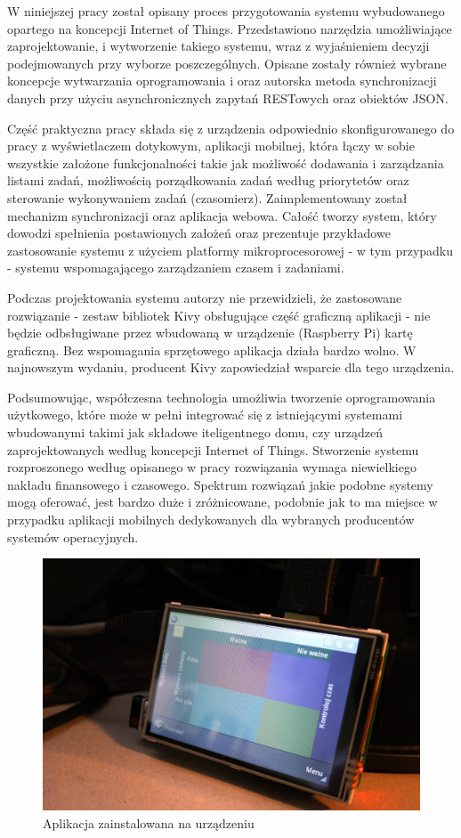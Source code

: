 W niniejszej pracy został opisany proces przygotowania systemu wybudowanego opartego na koncepcji Internet of Things.
Przedstawiono narzędzia umożliwiające zaprojektowanie, i wytworzenie takiego systemu, wraz z wyjaśnieniem decyzji podejmowanych przy wyborze poszczególnych. Opisane zostały również wybrane koncepcje wytwarzania oprogramowania i oraz autorska metoda synchronizacji danych przy użyciu asynchronicznych zapytań RESTowych oraz obiektów JSON.

Część praktyczna pracy składa się z urządzenia odpowiednio skonfigurowanego do pracy z wyświetlaczem dotykowym, aplikacji mobilnej, która  łączy w sobie wszystkie założone funkcjonalności takie jak możliwość dodawania i zarządzania listami zadań, możliwością porządkowania zadań według priorytetów oraz sterowanie wykonywaniem zadań (czasomierz). Zaimplementowany został mechanizm synchronizacji oraz aplikacja webowa. Całość tworzy system, który dowodzi spełnienia postawionych założeń oraz prezentuje przykładowe zastosowanie systemu z użyciem platformy mikroprocesorowej - w tym przypadku - systemu wspomagającego zarządzaniem czasem i zadaniami.

Podczas projektowania systemu autorzy nie przewidzieli, że zastosowane rozwiązanie - zestaw bibliotek Kivy obsługujące część graficzną aplikacji - nie będzie odbsługiwane przez wbudowaną w urządzenie (Raspberry Pi) kartę graficzną. Bez wspomagania sprzętowego aplikacja działa bardzo wolno. W najnowszym wydaniu, producent Kivy zapowiedział wsparcie dla tego urządzenia.

Podsumowując, współczesna technologia umożliwia tworzenie oprogramowania użytkowego, które może w pełni integrować się z istniejącymi systemami wbudowanymi takimi jak składowe iteligentnego domu, czy urządzeń zaprojektowanych według koncepcji Internet of Things. Stworzenie systemu rozproszonego według opisanego w pracy rozwiązania wymaga niewielkiego nakładu finansowego i czasowego. Spektrum rozwiązań jakie podobne systemy mogą oferować, jest bardzo duże i zróżnicowane, podobnie jak to ma miejsce w przypadku aplikacji mobilnych dedykowanych dla wybranych producentów systemów operacyjnych.

\begin{figure}[ht]
  \centering
  \includegraphics[width=\textwidth]{images/przyklad.png}
  \caption{Aplikacja zainstalowana na urządzeniu}
  \label{figure:przykladowa_app}
\end{figure}
